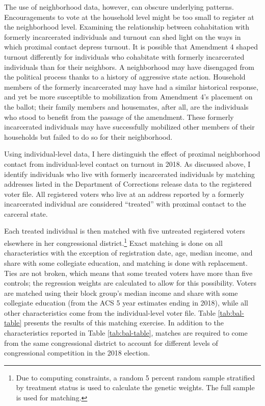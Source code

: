 \documentclass[
  12pt,
]{article}
\begin{document}
The use of neighborhood data, however, can obscure underlying patterns. Encouragements to vote at the household level might be too small to register at the neighborhood level. Examining the relationship between cohabitation with formerly incarcerated individuals and turnout can shed light on the ways in which proximal contact depress turnout. It is possible that Amendment 4 shaped turnout differently for individuals who cohabitate with formerly incarcerated individuals than for their neighbors. A neighborhood may have disengaged from the political process thanks to a history of aggressive state action. Household members of the formerly incarcerated may have had a similar historical response, and yet be more susceptible to mobilization from Amendment 4's placement on the ballot; their family members and housemates, after all, are the individuals who stood to benefit from the passage of the amendment. These formerly incarcerated individuals may have successfully mobilized other members of their households but failed to do so for their neighborhood.

Using individual-level data, I here distinguish the effect of proximal neighborhood contact from individual-level contact on turnout in 2018. As discussed above, I identify individuals who live with formerly incarcerated individuals by matching addresses listed in the Department of Corrections release data to the registered voter file. All registered voters who live at an address reported by a formerly incarcerated individual are considered ``treated'' with proximal contact to the carceral state.

Each treated individual is then matched with five untreated registered voters elsewhere in her congressional district.\footnote{Due to computing constraints, a random 5 percent random sample stratified by treatment status is used to calculate the genetic weights. The full sample is used for matching.} Exact matching is done on all characteristics with the exception of registration date, age, median income, and share with some collegiate education, and matching is done with replacement. Ties are not broken, which means that some treated voters have more than five controls; the regression weights are calculated to allow for this possibility. Voters are matched using their block group's median income and share with some collegiate education (from the ACS 5 year estimates ending in 2018), while all other characteristics come from the individual-level voter file. Table \ref{tab:bal-table} presents the results of this matching exercise. In addition to the characteristics reported in Table \ref{tab:bal-table}, matches are required to come from the same congressional district to account for different levels of congressional competition in the 2018 election.
\end{document}
